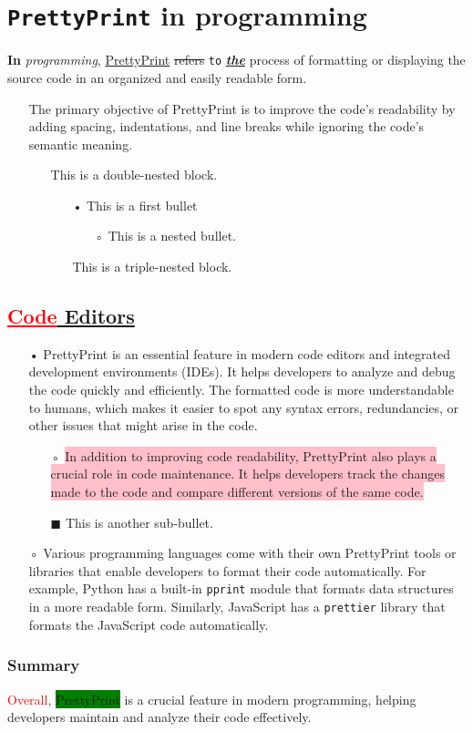 \documentclass[12pt, a4paper]{article}
\begin{document}
\section{\texttt{PrettyPrint} in programming}
\textbf{In} \textit{programming}, \underline{PrettyPrint} \sout{refers} \texttt{to} \underline{\textbf{\textit{the}}} process of formatting or displaying the source code in an organized and easily readable form. 

\begin{itemize}
\item[ ] The primary objective of PrettyPrint is to improve the code's readability by adding spacing, indentations, and line breaks while ignoring the code's semantic meaning.

\begin{itemize}
\item[ ] This is a double-nested block.

\begin{itemize}
\item[•] This is a first bullet
\begin{itemize}
\item[◦] This is a nested bullet.
\end{itemize}
\item[ ] This is a triple-nested block.

\end{itemize}
\end{itemize}
\end{itemize}
\subsection{\textcolor{red}{\underline{Code}}\underline{ Editors}}
\begin{itemize}
\item[•] PrettyPrint is an essential feature in modern code editors and integrated development environments (IDEs). It helps developers to analyze and debug the code quickly and efficiently. The formatted code is more understandable to humans, which makes it easier to spot any syntax errors, redundancies, or other issues that might arise in the code.
\begin{itemize}
\item[◦] \colorbox{pink}{In addition to improving code readability, PrettyPrint also plays a crucial role in code maintenance. It helps developers track the changes made to the code and compare different versions of the same code.}
\item[$\blacksquare$] This is another sub-bullet.
\end{itemize}
\item[◦] Various programming languages come with their own PrettyPrint tools or libraries that enable developers to format their code automatically. For example, Python has a built-in \texttt{pprint} module that formats data structures in a more readable form. Similarly, JavaScript has a \texttt{prettier} library that formats the JavaScript code automatically.
\end{itemize}
\subsubsection{Summary}
\textcolor{red}{Overall}, \colorbox{green}{PrettyPrint} is a crucial feature in modern programming, helping developers maintain and analyze their code effectively.
\end{document}

